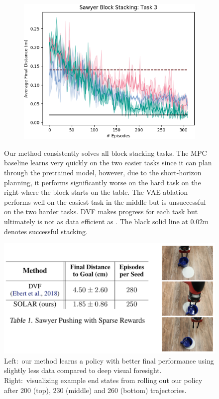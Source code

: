 \begin{figure}
\begin{subfigure}{0.32\linewidth}
        \includegraphics[width=\linewidth]{img/solar/stacking-3.png}
        \caption{}
    \end{subfigure}
    \caption{Our method consistently solves all block stacking tasks. The MPC baseline learns very quickly on the two easier tasks since it can plan through the pretrained model, however, due to the short-horizon planning, it performs significantly worse on the hard task on the right where the block starts on the table. The VAE ablation performs well on the easiest task in the middle but is unsuccessful on the two harder tasks. DVF makes progress for each task but ultimately is not as data efficient as \metabbr. The black solid line at $0.02$m denotes successful stacking.}
    \label{fig:stacking-results}
    \vspace{-.5em}
\end{figure}

\begin{figure}
    \centering
    \includegraphics[width=\linewidth]{img/solar/pushing-table.png}
    \caption{Left:~our method learns a policy with better final performance using slightly less data compared to deep visual foresight. Right:~visualizing example end states from rolling out our policy after 200 (top), 230 (middle) and 260 (bottom) trajectories.}
    \label{fig:pushing-results}
    \vspace{-.5em}
\end{figure}

